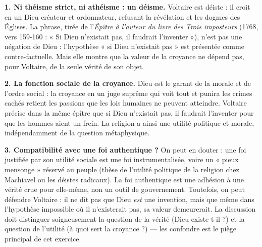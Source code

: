 \documentclass[11pt]{article}
\begin{document}
\begin{corrige}
\textbf{1. Ni théisme strict, ni athéisme : un déisme.} Voltaire est déiste : il croit en un Dieu créateur et ordonnateur, refusant la révélation et les dogmes des Églises. La phrase, tirée de l'\emph{Épître à l'auteur du livre des Trois imposteurs} (1768, vers 159-160 : « Si Dieu n'existait pas, il faudrait l'inventer »), n'est pas une négation de Dieu : l'hypothèse « si Dieu n'existait pas » est présentée comme contre-factuelle. Mais elle montre que la valeur de la croyance ne dépend pas, pour Voltaire, de la seule vérité de son objet.

\textbf{2. La fonction sociale de la croyance.} Dieu est le garant de la morale et de l'ordre social : la croyance en un juge suprême qui voit tout et punira les crimes cachés retient les passions que les lois humaines ne peuvent atteindre. Voltaire précise dans la même épître que si Dieu n'existait pas, il faudrait l'inventer pour que les hommes aient un frein. La religion a ainsi une utilité politique et morale, indépendamment de la question métaphysique.

\textbf{3. Compatibilité avec une foi authentique ?} On peut en douter : une foi justifiée par son utilité sociale est une foi instrumentalisée, voire un « pieux mensonge » réservé au peuple (thèse de l'utilité politique de la religion chez Machiavel ou les déistes radicaux). La foi authentique est une adhésion à une vérité crue pour elle-même, non un outil de gouvernement. Toutefois, on peut défendre Voltaire : il ne dit pas que Dieu \emph{est} une invention, mais que même dans l'hypothèse impossible où il n'existerait pas, sa valeur demeurerait. La discussion doit distinguer soigneusement la question de la vérité (Dieu existe-t-il ?) et la question de l'utilité (à quoi sert la croyance ?) — les confondre est le piège principal de cet exercice.
\end{corrige}
\end{document}
